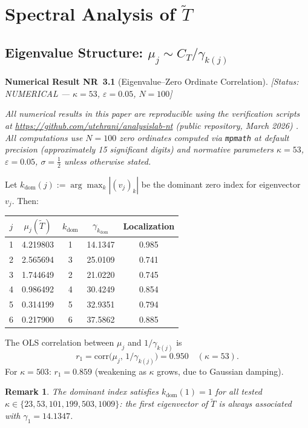 \documentclass[11pt]{article}
\newtheorem*{remark}{Remark}
\newcommand{\Tt}{\widetilde{T}}
\newcommand{\CT}{C_{T}}
\newcommand{\kdom}{k_{\mathrm{dom}}}
\begin{document}
\section{Spectral Analysis of $\widetilde{T}$}

\subsection{Eigenvalue Structure: $\mu_j \sim \CT/\gamma_{k(j)}$}

\textbf{Numerical Result NR~3.1} (Eigenvalue--Zero Ordinate Correlation).
\emph{[Status: NUMERICAL --- $\kappa=53$, $\varepsilon=0.05$, $N=100$]}

\emph{All numerical results in this paper are reproducible using
the verification scripts at \url{https://github.com/utehrani/analysislab-nt}
(public repository, March 2026) \cite{Code26}.
All computations use $N=100$ zero ordinates computed via \texttt{mpmath}
at default precision (approximately 15 significant digits) and normative
parameters $\kappa=53$, $\varepsilon=0.05$, $\sigma=\tfrac{1}{2}$
unless otherwise stated.}

Let $\kdom(j) := \arg\max_k|(v_j)_k|$ be the dominant zero index
for eigenvector $v_j$. Then:

\begin{center}
\begin{tabular}{ccccc}
\toprule
$j$ & $\mu_j(\Tt)$ & $\kdom$ & $\gamma_{\kdom}$ & Localization \\
\midrule
1 & 4.219803 & 1 & 14.1347 & 0.985 \\
2 & 2.565694 & 3 & 25.0109 & 0.741 \\
3 & 1.744649 & 2 & 21.0220 & 0.745 \\
4 & 0.986492 & 4 & 30.4249 & 0.854 \\
5 & 0.314199 & 5 & 32.9351 & 0.794 \\
6 & 0.217900 & 6 & 37.5862 & 0.885 \\
\bottomrule
\end{tabular}
\end{center}

The OLS correlation between $\mu_j$ and $1/\gamma_{k(j)}$ is
\[
r_1 = \mathrm{corr}\bigl(\mu_j,\,1/\gamma_{k(j)}\bigr) = 0.950
\quad(\kappa=53).
\]
For $\kappa=503$: $r_1 = 0.859$ (weakening as $\kappa$ grows,
due to Gaussian damping).

\begin{remark}
The dominant index satisfies $\kdom(1) = 1$ for all tested
$\kappa\in\{23,53,101,199,503,1009\}$:
the first eigenvector of $\Tt$ is always associated with
$\gamma_1 = 14.1347$.
\end{remark}
\end{document}
